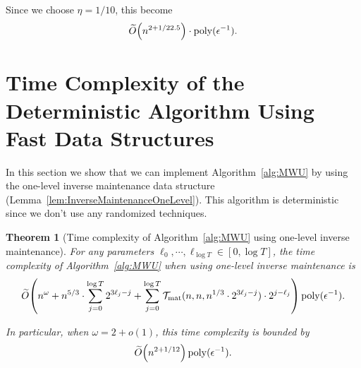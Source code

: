 \documentclass[11pt]{article}
\newtheorem{theorem}{Theorem}[section]
\newcommand{\Tmat}{\mathcal{T}_{\mathrm{mat}}}
\let\originalleft\left
\let\originalright\right
\renewcommand{\left}{\mathopen{}\mathclose\bgroup\originalleft}
\renewcommand{\right}{\aftergroup\egroup\originalright}
\newcommand{\wt}{\widetilde}
\DeclareMathOperator*{\poly}{{\mathrm{poly}}}
\begin{document}
Since we choose $\eta = 1/10$, this become 
\begin{align*}
\wt{O}\left(n^{2 + 1 / 22.5} \right) \cdot \poly(\epsilon^{-1}).
\end{align*}

 \section{Time Complexity of the Deterministic Algorithm Using Fast Data Structures}\label{sec:time_deterministic}
In this section we show that we can implement Algorithm~\ref{alg:MWU} by using the one-level inverse maintenance data structure (Lemma~\ref{lem:InverseMaintenanceOneLevel}). This algorithm is deterministic since we don't use any randomized techniques.


\begin{theorem}[Time complexity of Algorithm~\ref{alg:MWU} using one-level inverse maintenance]\label{thm:time_deterministic}
For any parameters $\ell_0, \cdots, \ell_{\log T} \in [0,\log T]$, the time complexity of Algorithm~\ref{alg:MWU} when using one-level inverse maintenance is
\begin{align*}
\wt{O}\left(n^{\omega} + n^{5/3} \cdot \sum_{j=0}^{\log T} 2^{3 \ell_j - j} + \sum_{j=0}^{\log T} \Tmat(n,n, n^{1/3} \cdot 2^{3 \ell_j - j}) \cdot 2^{j - \ell_j}\right) \poly(\epsilon^{-1}).
\end{align*}

In particular, when $\omega = 2 + o(1)$, this time complexity is bounded by
\[
\wt{O}\left(n^{2+1/12} \right) \poly(\epsilon^{-1}).
\]
\end{theorem}
\end{document}

